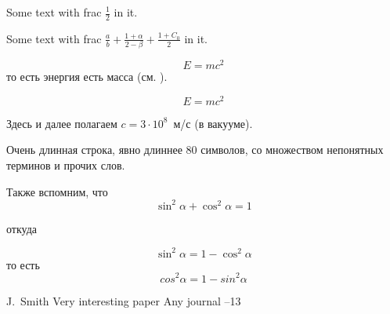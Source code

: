 \documentclass{article}
\begin{document}
Some text with frac $\frac{1}{2}$ in it.%

Some text with frac $\frac{a}{b}+\frac{1+\alpha}{2-\beta}+\frac{1+C_0}{2}$ in it.  %



\begin{equation}\label{eq1}
E=mc^2
\end{equation}
то есть энергия есть масса (см. \cite{Einstein}).

$$E=mc^2$$

Здесь и далее полагаем $c=3\cdot10^8$~м/с (в вакууме).

Очень длинная строка, явно длиннее 80 символов, со множеством непонятных терминов и прочих слов.

Также вспомним, что
\begin{equation*}
\sin^2 \alpha + \cos^2 \alpha = 1
\end{equation*}

откуда

\begin{equation*}
\sin^2 \alpha = 1 - \cos^2 \alpha
\end{equation*}
то есть
$$
  cos^2 \alpha = 1 - sin^2 \alpha
$$

\begin{thebibliography}{99}


\by J.~Smith
\paper Very interesting paper
\jour Any journal
--13


\end{thebibliography}
\end{document}

